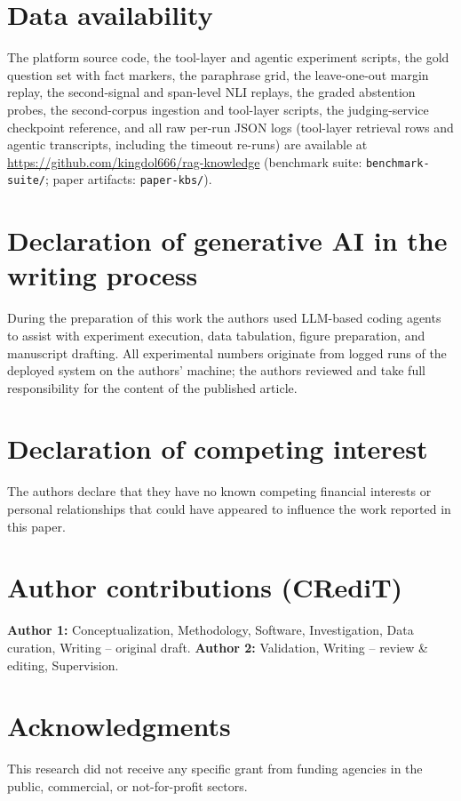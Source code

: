 \section*{Data availability}
The platform source code, the tool-layer and agentic experiment scripts,
the gold question set with fact markers, the paraphrase grid, the
leave-one-out margin replay, the second-signal and span-level NLI
replays, the graded abstention probes, the second-corpus ingestion and
tool-layer scripts, the judging-service checkpoint
reference, and all raw per-run JSON logs (tool-layer retrieval rows and
agentic transcripts, including the timeout re-runs) are available at
\url{https://github.com/kingdol666/rag-knowledge} (benchmark suite:
\texttt{benchmark-suite/}; paper artifacts: \texttt{paper-kbs/}).

\section*{Declaration of generative AI in the writing process}
During the preparation of this work the authors used LLM-based coding
agents to assist with experiment execution, data tabulation, figure
preparation, and manuscript drafting. All experimental numbers originate
from logged runs of the deployed system on the authors' machine; the
authors reviewed and take full responsibility for the content of the
published article.

\section*{Declaration of competing interest}
The authors declare that they have no known competing financial interests
or personal relationships that could have appeared to influence the work
reported in this paper.

\section*{Author contributions (CRediT)}
\textbf{Author 1:} Conceptualization, Methodology, Software, Investigation,
Data curation, Writing -- original draft. \textbf{Author 2:} Validation,
Writing -- review \& editing, Supervision. %

\section*{Acknowledgments}
This research did not receive any specific grant from funding agencies in
the public, commercial, or not-for-profit sectors. %

